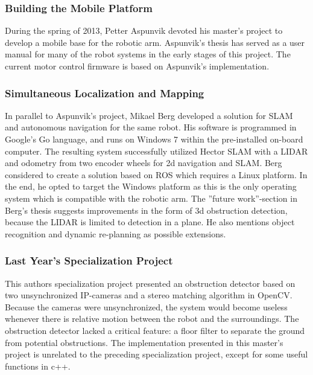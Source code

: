 \subsubsection{Building the Mobile Platform}
During the spring of 2013, Petter Aspunvik devoted his master's project to develop a mobile base for the robotic arm\cite{aspunvik}. Aspunvik's thesis has served as a user manual for many of the robot systems in the early stages of this project. The current motor control firmware is based on Aspunvik's implementation.

\subsubsection{Simultaneous Localization and Mapping}

In parallel to Aspunvik's project, Mikael Berg developed a solution for \ac{SLAM} and autonomous navigation for the same robot\cite{berg}. His software is programmed in Google's Go language, and runs on Windows 7 within the pre-installed on-board computer. The resulting system successfully utilized Hector SLAM with a LIDAR and odometry from two encoder wheels for 2d navigation and \ac{SLAM}. Berg considered to create a solution based on \ac{ROS} which requires a Linux platform. In the end, he opted to target the Windows platform as this is the only operating system which is compatible with the robotic arm. The ''future work''-section in Berg's thesis suggests improvements in the form of 3d obstruction detection, because the LIDAR is limited to detection in a plane. He also mentions object recognition and dynamic re-planning as possible extensions. 

\subsubsection{Last Year's Specialization Project}

This authors specialization project\cite{lindrup} presented an obstruction detector based on two unsynchronized IP-cameras and a stereo matching algorithm in \ac{OpenCV}. Because the cameras were unsynchronized, the system would become useless whenever there is relative motion between the robot and the surroundings. The obstruction detector lacked a critical feature: a floor filter to separate the ground from potential obstructions. The implementation presented in this master's project is unrelated to the preceding specialization project, except for some useful functions in c++.


